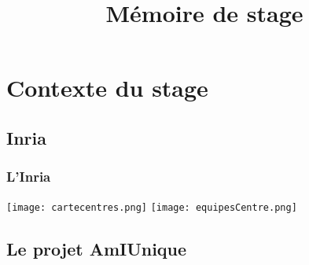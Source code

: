 \documentclass{beamer}
\begin{document}
	
	\title{Mémoire de stage}
	\maketitle
	
	\begin{frame}
		
		\tableofcontents
		
	\end{frame}

	\section{Contexte du stage}
	\subsection{Inria}
	\begin{frame}
		\frametitle{L'Inria}
		\centering
		\texttt{[image: cartecentres.png]}
		\texttt{[image: equipesCentre.png]}
	\end{frame}

	\subsection{Le projet AmIUnique}
	\begin{frame}
		
	\end{frame}

	\begin{frame}
		
		\printbibliography
		
	\end{frame}
	
\end{document}
